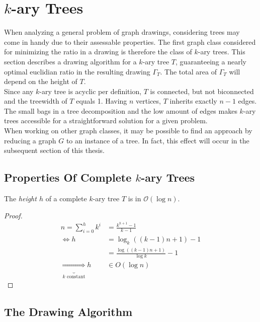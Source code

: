 \section{$k$-ary Trees}\label{s:k-ary_trees}
When analyzing a general problem of graph drawings, considering trees may come in handy due to their assessable properties. The first graph class considered for minimizing the ratio in a drawing is therefore the class of $k$-ary trees. This section describes a drawing algorithm for a $k$-ary tree $T$, guaranteeing a nearly optimal euclidian ratio in the resulting drawing $\Gamma_T$. The total area of $\Gamma_T$ will depend on the height of $T$.\\
Since any $k$-ary tree is acyclic per definition, $T$ is connected, but not biconnected and the treewidth of $T$ equals 1. Having $n$ vertices, $T$ inherits exactly $n-1$ edges. The small bags in a tree decomposition and the low amount of edges makes $k$-ary trees accessible for a straightforward solution for a given problem.\\
When working on other graph classes, it may be possible to find an approach by reducing a graph $G$ to an instance of a tree. In fact, this effect will occur in the subsequent section of this thesis.
\subsection{Properties Of Complete $k$-ary Trees}
\begin{lemma}The \emph{height $h$} of a complete $k$-ary tree $T$ is in $\mathcal{O}(\log n)$.\label{l:k-ary-tree_log_height}
\end{lemma}
\begin{proof}
	\begin{align}
		n = \sum_{i=0}^{h}k^i &= \frac{k^{h+1}-1}{k-1}\\
		\Leftrightarrow h &= \log_k((k-1)n+1)-1\\
		&= \frac{\log((k-1)n+1)}{\log k}-1\\
		\underbrace{\Rightarrow}_{k \text{ constant}}h &\in O(\log n)
	\end{align}
\end{proof}

\subsection{The Drawing Algorithm}


